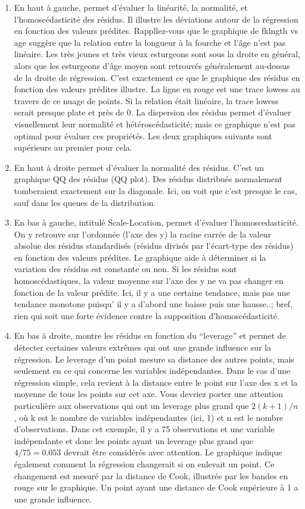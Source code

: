 \documentclass[
  12pt,
]{book}
\providecommand{\tightlist}{%
  \setlength{\itemsep}{0pt}\setlength{\parskip}{0pt}}
\begin{document}
\begin{enumerate}
\def\labelenumi{\arabic{enumi}.}
\tightlist
\item
  En haut à gauche, permet d'évaluer la linéarité, la normalité, et l'homoscédasticité des résidus. Il illustre les déviations autour de la régression en fonction des valeurs prédites. Rappllez-vous que le graphique de fklngth vs age suggère que la relation entre la longueur à la fourche et l'âge n'est pas linéaire. Les très jeunes et très vieux esturgeons sont sous la droite en général, alors que les esturgeons d'âge moyen sont retrouvés généralement au-dessus de la droite de régression. C'est exactement ce que le graphique des résidus en fonction des valeurs prédites illustre. La ligne en rouge est une trace lowess au travers de ce nuage de points. Si la relation était linéaire, la trace lowess serait presque plate et près de 0. La dispersion des résidus permet d'évaluer visuellement leur normalité et hétéroscédasticité; mais ce graphique n'est pas optimal pour évaluer ces propriétés. Les deux graphiques suivants sont supérieurs au premier pour cela.
\item
  En haut à droite permet d'évaluer la normalité des résidus. C'est un graphique QQ des résidus (QQ plot). Des résidus distribués normalement tomberaient exactement sur la diagonale. Ici, on voit que c'est presque le cas, sauf dans les queues de la distribution.
\item
  En bas à gauche, intitulé Scale-Location, permet d'évaluer l'homoscedasticité. On y retrouve sur l'ordonnée (l'axe des y) la racine carrée de la valeur absolue des résidus standardisés (résidus divisés par l'écart-type des résidus) en fonction des valeurs prédites. Le graphique aide à déterminer si la variation des résidus est constante ou non. Si les résidus sont homoscédastiques, la valeur moyenne sur l'axe des y ne va pas changer en fonction de la valeur prédite. Ici, il y a une certaine tendance, mais pas une tendance monotone puisqu' il y a d'abord une baisse puis une hausse..; bref, rien qui soit une forte évidence contre la supposition d'homoscédasticité.
\item
  En bas à droite, montre les résidus en fonction du ``leverage'' et permet de détecter certaines valeurs extrêmes qui ont une grande influence sur la régression. Le leverage d'un point mesure sa distance des autres points, mais seulement en ce qui concerne les variables indépendantes. Dans le cas d'une régression simple, cela revient à la distance entre le point sur l'axe des x et la moyenne de tous les points sur cet axe. Vous devriez porter une attention particulière aux observations qui ont un leverage plus grand que \(2(k+1)/n\), où k est le nombre de variables indépendantes (ici, 1) et n est le nombre d'observations. Dans cet exemple, il y a 75 observations et une variable indépendante et donc les points ayant un leverage plus grand que \(4 / 75 = 0.053\) devrait être considérés avec attention. Le graphique indique également comment la régression changerait si on enlevait un point. Ce changement est mesuré par la distance de Cook, illustrée par les bandes en rouge sur le graphique. Un point ayant une distance de Cook supérieure à 1 a une grande influence.
\end{enumerate}
\end{document}
